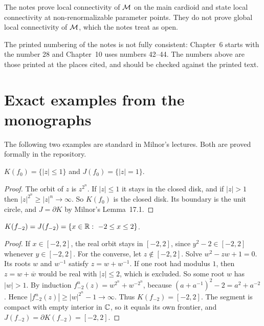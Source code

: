 \begin{remark}
The notes prove local connectivity of $\mathcal M$ on the main cardioid and state local
connectivity at non-renormalizable parameter points.  They do not prove global
local connectivity of $\mathcal M$, which the notes treat as open.
\end{remark}

\begin{remark}[Numbering]
The printed numbering of the notes is not fully consistent: Chapter~6 starts with
the number 28 and Chapter~10 uses numbers 42--44.  The numbers above are those
printed at the places cited, and should be checked against the printed text.
\end{remark}

\section{Exact examples from the monographs}
\label{sec:digest-examples}

The following two examples are standard in Milnor's lectures.  Both are proved
formally in the repository.

\begin{theorem}[Filled and Julia sets for $c=0$]
\label{thm:example-zero}
$K(f_0)=\{|z|\le1\}$ and $J(f_0)=\{|z|=1\}$.
\end{theorem}

\begin{proof}
The orbit of $z$ is $z^{2^n}$.  If $|z|\le1$ it stays in the closed disk, and if
$|z|>1$ then $|z|^{2^n}\ge|z|^n\to\infty$.  So $K(f_0)$ is the closed disk.  Its boundary
is the unit circle, and $J=\partial K$ by Milnor's Lemma~17.1.
\end{proof}

\begin{theorem}[Filled and Julia sets for $c=-2$]
\label{thm:example-minus-two}
$K(f_{-2})=J(f_{-2})=\{x\in\mathbb R:\ -2\le x\le2\}$.
\end{theorem}

\begin{proof}
If $x\in[-2,2]$, the real orbit stays in $[-2,2]$, since $y^2-2\in[-2,2]$ whenever
$y\in[-2,2]$.  For the converse, let $z\notin[-2,2]$.  Solve $w^2-zw+1=0$.  Its roots $w$
and $w^{-1}$ satisfy $z=w+w^{-1}$.  If one root had modulus $1$, then $z=w+\overline w$
would be real with $|z|\le2$, which is excluded.  So some root $w$ has $|w|>1$.  By
induction $f_{-2}^n(z)=w^{2^n}+w^{-2^n}$, because
$(a+a^{-1})^2-2=a^2+a^{-2}$.  Hence $|f_{-2}^n(z)|\ge|w|^{2^n}-1\to\infty$.  Thus
$K(f_{-2})=[-2,2]$.  The segment is compact with empty interior in $\mathbb C$, so it equals its
own frontier, and $J(f_{-2})=\partial K(f_{-2})=[-2,2]$.
\end{proof}

